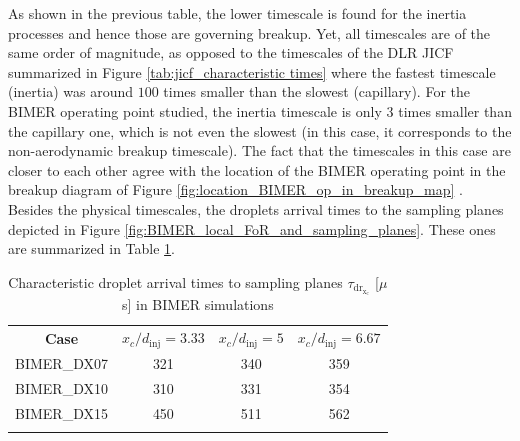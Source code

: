 As shown in the previous table, the lower timescale is found for the inertia processes and hence those are governing breakup. Yet, all timescales are of the same order of magnitude, as opposed to the timescales of the DLR JICF summarized in Figure \ref{tab:jicf_characteristic times} where the fastest timescale (inertia) was around $100$ times smaller than the slowest (capillary). For the BIMER operating point studied, the inertia timescale is only $3$ times smaller than the capillary one, which is not even the slowest (in this case, it corresponds to the non-aerodynamic breakup timescale). The fact that the timescales in this case are closer to each other agree with the location of the BIMER operating point in the breakup diagram of Figure \ref{fig:location_BIMER_op_in_breakup_map} . Besides the physical timescales, the droplets arrival times to the sampling planes depicted in Figure \ref{fig:BIMER_local_FoR_and_sampling_planes}. These ones are summarized in Table \ref{tab:BIMER_SPS_characteristic_droplet_sampling_times}. 




\begin{table}[!h]
\centering
\caption{Characteristic droplet arrival times to sampling planes $\tau_\mathrm{dr_{x_c}}$ [$\mu$s] in BIMER simulations}
\begin{tabular}{cccc}
\thickhline
\textbf{Case} & $x_c/d_\mathrm{inj} = 3.33$ & $x_c/d_\mathrm{inj} = 5$ & $x_c/d_\mathrm{inj} = 6.67$  \\
\thickhline 
BIMER\_DX07 & 321 & 340 & 359 \\
BIMER\_DX10 & 310 & 331 & 354 \\
BIMER\_DX15 & 450 & 511 & 562 \\
\thickhline
\end{tabular}
\label{tab:BIMER_SPS_characteristic_droplet_sampling_times}
\end{table}




